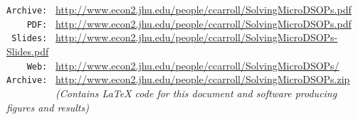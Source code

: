 \documentclass[titlepage]{\econtex}
\begin{document}
\begin{footnotesize}
\parbox{\textwidth}{
\begin{center}
\begin{tabbing}
\texttt{Archive:~} \= \= \url{http://www.econ2.jhu.edu/people/ccarroll/SolvingMicroDSOPs.pdf} \kill \\  %
\texttt{~~~~PDF:~} \> \> \url{http://www.econ2.jhu.edu/people/ccarroll/SolvingMicroDSOPs.pdf} \\
\texttt{~Slides:~} \> \> \url{http://www.econ2.jhu.edu/people/ccarroll/SolvingMicroDSOPs-Slides.pdf} \\
\texttt{~~~~Web:~} \> \> \url{http://www.econ2.jhu.edu/people/ccarroll/SolvingMicroDSOPs/} \\
\texttt{Archive:~} \> \> \url{http://www.econ2.jhu.edu/people/ccarroll/SolvingMicroDSOPs.zip} \\
\texttt{~~~~~~~~~} \> \> \textit{(Contains LaTeX code for this document and software producing figures and results)}
\end{tabbing}
\end{center}
}
\end{footnotesize}

\begin{authorsinfo}
\end{authorsinfo}
\end{document}
